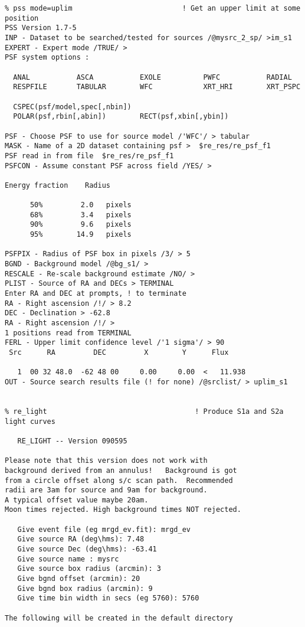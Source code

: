 \begin{small}
\begin{verbatim}
% pss mode=uplim                          ! Get an upper limit at some position
PSS Version 1.7-5
INP - Dataset to be searched/tested for sources /@mysrc_2_sp/ >im_s1
EXPERT - Expert mode /TRUE/ > 
PSF system options :

  ANAL           ASCA           EXOLE          PWFC           RADIAL
  RESPFILE       TABULAR        WFC            XRT_HRI        XRT_PSPC

  CSPEC(psf/model,spec[,nbin])
  POLAR(psf,rbin[,abin])        RECT(psf,xbin[,ybin])

PSF - Choose PSF to use for source model /'WFC'/ > tabular
MASK - Name of a 2D dataset containing psf >  $re_res/re_psf_f1
PSF read in from file  $re_res/re_psf_f1
PSFCON - Assume constant PSF across field /YES/ > 

Energy fraction    Radius

      50%         2.0   pixels
      68%         3.4   pixels
      90%         9.6   pixels
      95%        14.9   pixels

PSFPIX - Radius of PSF box in pixels /3/ > 5
BGND - Background model /@bg_s1/ > 
RESCALE - Re-scale background estimate /NO/ > 
PLIST - Source of RA and DECs > TERMINAL
Enter RA and DEC at prompts, ! to terminate
RA - Right ascension /!/ > 8.2
DEC - Declination > -62.8
RA - Right ascension /!/ > 
1 positions read from TERMINAL
FERL - Upper limit confidence level /'1 sigma'/ > 90
 Src      RA         DEC         X        Y      Flux

   1  00 32 48.0  -62 48 00     0.00     0.00  <   11.938
OUT - Source search results file (! for none) /@srclist/ > uplim_s1


% re_light                                   ! Produce S1a and S2a light curves
 
   RE_LIGHT -- Version 090595
 
Please note that this version does not work with 
background derived from an annulus!   Background is got
from a circle offset along s/c scan path.  Recommended 
radii are 3am for source and 9am for background. 
A typical offset value maybe 20am. 
Moon times rejected. High background times NOT rejected.

   Give event file (eg mrgd_ev.fit): mrgd_ev
   Give source RA (deg\hms): 7.48
   Give source Dec (deg\hms): -63.41
   Give source name : mysrc
   Give source box radius (arcmin): 3
   Give bgnd offset (arcmin): 20
   Give bgnd box radius (arcmin): 9
   Give time bin width in secs (eg 5760): 5760
 
The following will be created in the default directory
 

\end{verbatim}
\end{small}
